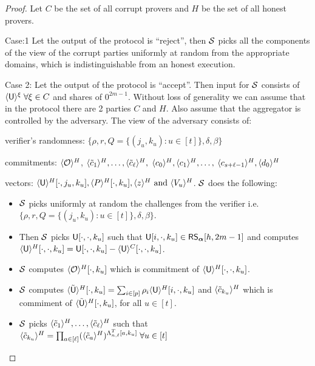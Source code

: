 \begin{proof}
	Let $C$ be the set of all corrupt provers and $H$ be the set of all honest provers. 

	Case:1 Let the output of the protocol is ``reject'', then $\mathcal{S}$ picks all the components of the view of the corrupt parties uniformly at random from the appropriate domains, which is indistinguishable from an honest execution.
	
	Case 2: Let the output of the protocol is ``accept''. Then input for $\mathcal{S}$ consists of $\langle{\mathsf{U}}\rangle^\xi \; \forall \xi\in C$ and shares of $0^{2m-1}$. Without loss of generality we can assume that in the protocol there are 2 parties $C$ and $H$. Also assume that the aggregator is controlled by the adversary. The view of the adversary consists of:
	
	verifier's randomness: $\{\rho, r, Q=\{(j_u,k_u):u\in[t]\}, \delta, \beta\}$
	
	commitments: $\langle{\mathcal{O}}\rangle^H$, $\langle{\tilde{c}_1}\rangle^H,\ldots,\langle{\tilde{c}_{\ell}}\rangle^H,$ $\langle{c_0}\rangle^H, \langle{c_1}\rangle^H, \ldots,$ $\langle{c_{s+\ell-1}}\rangle^H, \langle{d_0}\rangle^H$
	
	vectors: $\langle{\mathsf{U}}\rangle^H[\cdot,j_u,k_u], \langle{P}\rangle^H[\cdot,k_u], \langle{z}\rangle^H \text{ and } \langle{V_u}\rangle^H$.
	$\mathcal{S}$ does the following: 
	\begin{itemize}
		\item $\mathcal{S}$ picks uniformly at random the challenges from the verifier i.e. $\{\rho, r, Q=\{(j_u,k_u):u\in[t]\}, \delta, \beta\}$.
		
		\item Then $\mathcal{S}$ picks $\mathsf{U}[\cdot,\cdot,k_u]$ such that $\mathsf{U}[i,\cdot, k_u] \in \mathsf{RS}_{\bm{\alpha}}[h,2m-1]$ and computes $\langle{\mathsf{U}}\rangle^H[\cdot, \cdot, k_u] = \mathsf{U}[\cdot,\cdot, k_u] - \langle{\mathsf{U}}\rangle^C[\cdot, \cdot,k_u]$.
		
		\item $\mathcal{S}$ computes $\langle{\mathcal{O}}\rangle^H[\cdot,k_u]$ which is commitment of $\langle{\mathsf{U}}\rangle^H[\cdot, \cdot, k_u]$.
		
		\item $\mathcal{S}$ computes $\langle{\tilde{\mathsf{U}}}\rangle^H[\cdot,k_u] = \sum_{i \in [p]} \rho_i\langle{\mathsf{U}}\rangle^H[i,\cdot,k_u]$ and $\langle{\tilde{c}_{k_u}}\rangle^H$ which is commiment of $\langle{\tilde{\mathsf{U}}}\rangle^H[\cdot,k_u]$, for all $u\in[t]$.
		
		\item $\mathcal{S}$ picks $\langle{\tilde{c}_1}\rangle^H,\ldots,\langle{\tilde{c}_{\ell}}\rangle^H$ such that\\
		$\langle{\tilde{c}_{k_u}}\rangle^H = \prod_{a\in[\ell]} (\langle{\tilde{c}_{a}}\rangle^H)^{\Lambda_{n,\ell}^T[a,k_u]} \; \forall u\in[t]$ 
		

\end{itemize}
\end{proof}
